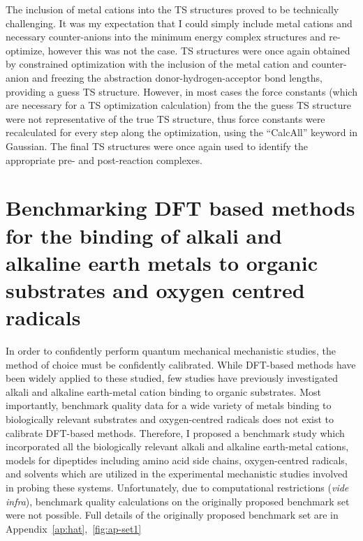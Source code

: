 The inclusion of metal cations into the TS structures proved to be technically challenging. It was my expectation that I could simply include metal cations and necessary counter-anions into the minimum energy complex structures and re-optimize, however this was not the case. TS structures were once again obtained by constrained optimization with the inclusion of the metal cation and counter-anion and freezing the abstraction donor-hydrogen-acceptor bond lengths, providing a guess TS structure. However, in most cases the force constants (which are necessary for a TS optimization calculation) from the the guess TS structure were not representative of the true TS structure, thus force constants were recalculated for every step along the optimization, using the ``CalcAll'' keyword in Gaussian. The final TS structures were once again used to identify the appropriate pre- and post-reaction complexes.

\section{Benchmarking DFT based methods for the binding of alkali and alkaline earth metals to organic substrates and oxygen centred radicals}
\label{sec:benchmark}

In order to confidently perform quantum mechanical mechanistic studies, the method of choice must be confidently calibrated. While DFT-based methods have been widely applied to these studied, few studies have previously investigated alkali and alkaline earth-metal cation binding to organic substrates.\cite{Corral2003, Suarez2011, Siu2001, Baldauf2013} Most importantly, benchmark quality data for a wide variety of metals binding to biologically relevant substrates and oxygen-centred radicals does not exist to calibrate DFT-based methods. Therefore, I proposed a benchmark study which incorporated all the biologically relevant alkali and alkaline earth-metal cations, models for dipeptides including amino acid side chains, oxygen-centred radicals, and solvents which are utilized in the experimental mechanistic studies involved in probing these systems. Unfortunately, due to computational restrictions (\emph{vide infra}), benchmark quality calculations on the originally proposed benchmark set were not possible. Full details of the originally proposed benchmark set are in Appendix~\ref{ap:hat},~\ref{fig:ap-set1}


